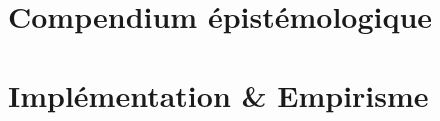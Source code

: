 \section{Compendium épistémologique}\label{sec:Compendium épistémologique} %



\section{Implémentation \& Empirisme}\label{sec:Implémentation} %


